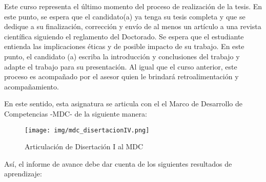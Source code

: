 Este curso representa el último momento del proceso de realización de la tesis. En este punto, se espera que el candidato(a) ya tenga su tesis completa y que se dedique a su finalización, corrección y envío de al menos un artículo a una revista científica siguiendo el reglamento del Doctorado. Se espera que el estudiante entienda las implicaciones éticas y de posible impacto de su trabajo. En este punto, el candidato (a) escriba la introducción y conclusiones del trabajo y adapte el trabajo para su presentación. Al igual que el curso anterior, este proceso es acompañado por el asesor quien le brindará retroalimentación y acompañamiento.

En este sentido, esta asignatura se articula con el el Marco de Desarrollo de Competencias -MDC- de la siguiente manera:

\begin{figure}[H]
\caption{Articulación de Disertación I al MDC \label{hito1_mdc} }
\begin{center}
\texttt{[image: img/mdc\_disertacionIV.png]}
\end{center}
\end{figure}

Así, el informe de avance debe dar cuenta de los siguientes resultados de aprendizaje:

